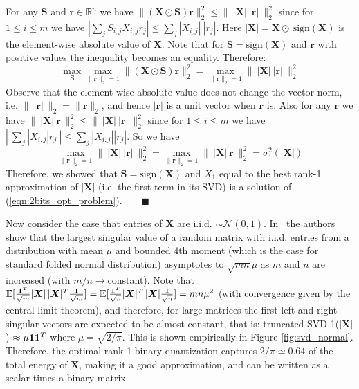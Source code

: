 \documentclass[10pt,twocolumn,letterpaper]{article}
\def\vr{{\bm{r}}}
\def\mX{{\bm{X}}}
\def\mS{{\bm{S}}}
\newcommand{\R}{\mathbb{R}}
\newcommand{\E}{\mathbb{E}}
\newcommand{\qed}{\blacksquare}
\begin{document}
For any $\mS$ and $\vr \in \R^n$ we have $ \| (\mX \odot \mS)\vr \|_2^2 \le   \| ~\! |\mX| ~\! |\vr| ~\! \|_2^2$ since for $1\le i \le m$ we have $|\sum_j S_{i,j}X_{i,j} r_j| \le \sum_j |X_{i,j}|~\! |r_j|$. Here $| \mX | = \mX \odot ~\! \text{sign}(\mX)$ is the element-wise absolute value of $\mX$. Note that for $\mS = \text{sign}(\mX)$ and $\vr$ with positive values the inequality becomes an equality. Therefore:
\begin{equation}
\max_{\mS} \max_{\|\vr\|_2=1}  \| (\mX \odot \mS)\vr \|_2^2 = \max_{\|\vr\|_2=1}  \| ~\! |\mX| ~\! |\vr| ~\! \|_2^2 
\end{equation}
Observe that the element-wise absolute value does not change the vector norm, i.e. $\|~\! |\vr| ~\! \|_2 = \|\vr\|_2$, and hence $| \vr |$ is a unit vector when $\vr$ is. Also for any $\vr$ we have $  \| ~\! |\mX| ~\! \vr ~\! \|_2^2 \le  \| ~\! |\mX| ~\! |\vr| ~\! \|_2^2$ since for $1\le i \le m$ we have $|~\!\sum_j |X_{i,j}|r_j~\!| \le \sum_j |X_{i,j}| |r_j|$. So we have
\begin{equation} \label{eqn:trunc}
\max_{\|\vr\|_2=1}  \| ~\! |\mX| ~\! |\vr| ~\! \|_2^2 =  \max_{\|\vr\|_2=1}  \| ~\! |\mX| ~\! \vr ~\! \|_2^2 = \sigma_1^2( | \mX |)
\end{equation}
Therefore, we showed that $\mS = \text{sign}(\mX)$ and $X_1$ equal to the best rank-1 approximation of $|\mX|$ (i.e. the first term in its SVD) is a solution of (\ref{eqn:2bits_opt_problem}).$\quad\quad \qed$

Now consider the case that entries of $\mX$ are i.i.d. $\sim \mathcal{N}(0,1)$. In~\cite{bryc2019singular,silverstein1994spectral} the authors show that the largest singular value of a random matrix with i.i.d. entries from a distribution with mean $\mu$ and bounded 4th moment (which is the case for standard folded normal distribution) asymptotes to $\sqrt{mn}\mu$ as $m$ and $n$ are increased (with $m/n \to$constant). Note that $\E[\frac{{\bf 1}^T}{\sqrt{m}} |\mX|~\! |\mX|^T \frac{{\bf 1}}{\sqrt{m}} ]  = \E[\frac{{\bf 1}^T}{\sqrt{n}} |\mX|^T ~\! |\mX| \frac{{\bf 1}}{\sqrt{n}} ] = mn\mu^2$ (with convergence given by the central limit theorem), and therefore, for large matrices the first left and right singular vectors are expected to be almost constant, that is: truncated-SVD-1($|\mX|$) $\approx \mu {\bf 1} {\bf 1}^T$ where $\mu = \sqrt{2/\pi}$. This is shown empirically in Figure \ref{fig:svd_normal}. Therefore, the optimal rank-1 binary quantization captures $2/\pi \simeq 0.64$ of the total energy of $\mX$, making it a good approximation, and can be written as a scalar times a binary matrix.
\end{document}
